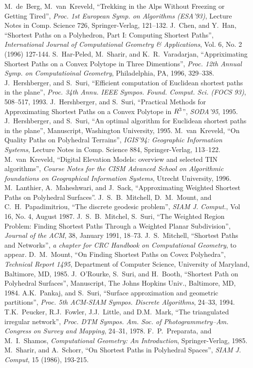 
\begin{thebibliography}{99}
\english 
{} M.~de~Berg, M.~van~Kreveld, ``Trekking in the
Alps Without Freezing or Getting Tired'', {\em Proc. 1st European
Symp. on Algorithms (ESA'93)}, Lecture Notes in Comp. Science 726,
Springer-Verlag, 121--132.
 J.~Chen, and  Y.~Han, ``Shortest Paths on a Polyhedron,
 Part I: Computing Shortest Paths'', {\em International Journal of Computational
Geometry \& Applications}, Vol. 6, No. 2 (1996) 127-144.
 S.~Har-Peled, M.~Sharir, and K.~R.~Varadarjan,
``Appriximating Shortest Paths on a Convex Polytope in Three
Dimentions'', {\em Proc. 12th Annual Symp. on Computatioinal 
Geometry}, Philadelphia, PA, 1996, 329--338.
 J.~Hershberger, and S.~Suri, ``Efficient
computation of Euclidean shortest paths in the plane'', {\em Proc. 34th
Annu. IEEE Sympos. Found. Comput. Sci. (FOCS 93)}, 508--517, 1993.
 J.~Hershberger, and S.~Suri, ``Practical
Methods for Approximating Shortest Paths on a Convex Polytope in $R^{\rm 3}$'', 
{\em SODA'95}, 1995.
 J.~Hershberger, and S.~Suri, ``An optimal
algorithm for Euclidean shortest paths in the plane'', Manuscript, 
Washington University, 1995.
 M.~van~Kreveld, ``On Quality Paths on Polyhedral
Terrains'', {\em IGIS'94: Geographic Information Systems}, Lecture
Notes in Comp. Science 884, Springer-Verlag, 113--122.
 M.~van~Kreveld, ``Digital Elevation Models:
overview and selected TIN algorithms'', {\em Course Notes for the
 CISM Advanced School on Algorithmic foundations on Geographical Information
 Systems}, Utrecht University, 1996.
 M.~Lanthier, A.~Maheshwari, and J.~Sack,
``Approximating Weighted Shortest Paths on Polyhedral Surfaces''.
 J.~S.~B.~Mitchell, D.~M.~Mount, and C.~H.~Papadimitriou, 
``The discrete geodesic problem'', {\em SIAM J. Comput.},
Vol 16, No. 4, August 1987.
 J.~S.~B.~Mitchel, S.~Suri, ``The Weighted
Region Problem: Finding Shortest Paths Through a Weighted Planar
Subdivision'', {\em Journal of the ACM}, 38, January 1991, 18--73.
 J.~S.~Mitchell, ``Shortest Paths and Networks'', 
{\em a chapter for CRC Handbook on Computational Geometry}, to appear.
 D.~M.~Mount, ``On  Finding Shortest Paths on Covex
Polyhedra'', {\em Technical Report 1495}, Department of Computer Science, 
University of Maryland, Baltimore, MD, 1985.
 J.~O'Rourke, S.~Suri, and H.~Booth, ``Shortest Path
on Polyhedral Surfaces'', Manuscript, The Johns Hopkins Univ., Baltimore, 
MD, 1984.
 A.K.~Pankaj, and S.~Suri, ``Surface approximation
and geometric partitions'', {\em Proc. 5th ACM-SIAM Sympos. Discrete
Algorithms}, 24--33, 1994.
 T.K.~Peucker, R.J.~Fowler, J.J.~Little, and D.M.~Mark,
``The triangulated irregular network'', {\em Proc. DTM Sympos. Am. Soc. 
of Photogrammetry--Am. Congress on Survey and Mapping}, 24--31, 1978.
 F.~P.~Preparata, and  M.~I.~Shamos,  {\em Computational
Geometry: An Introduction}, Springer-Verlag, 1985.
 M.~Sharir, and A.~Schorr, ``On Shortest Paths in Polyhedral
Spaces'', {\em SIAM J. Comput}, 15 (1986), 193-215.
\end{thebibliography}
\farsi 
